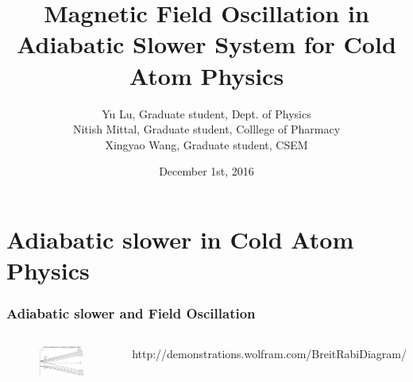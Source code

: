 \documentclass[10pt, xcolor=dvipsnames]{beamer}
\title[Magnetic Field Oscillation]{Magnetic Field Oscillation in Adiabatic Slower System for Cold Atom Physics}
\author[Yu Lu, Nitish Mittal, Xingyao Wang]{Yu Lu, Graduate student, Dept. of Physics \\  Nitish Mittal, Graduate student, Colllege of Pharmacy \\ Xingyao Wang, Graduate student, CSEM}
\institute{University of Texas at Austin}
\date{December 1st, 2016}
\begin{document}
\begin{frame}
  \titlepage
\end{frame}


\section[Introduction]{Adiabatic slower in Cold Atom Physics}

\begin{frame}
  \frametitle{Adiabatic slower and Field Oscillation}
  \begin{columns}
    \begin{figure}
      \graphicspath{{./images/}}
      \includegraphics[width=\textwidth, height=0.6\textheight]{ZeemanSplit}
    \end{figure}
    \tiny{http://demonstrations.wolfram.com/BreitRabiDiagram/}\\
    

\end{columns}
\end{frame}
\end{document}
